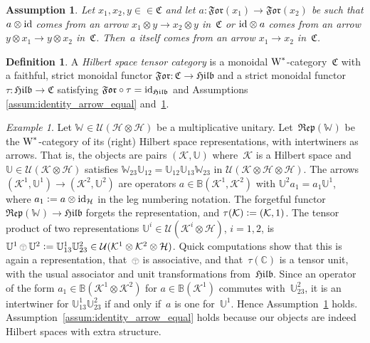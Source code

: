 \documentclass[a4paper]{amsart}
\numberwithin{equation}{section}
\theoremstyle{plain}
\numberwithin{theorem}{section}
\newtheorem{assumption}[theorem]{Assumption}
\theoremstyle{definition}
\newtheorem{definition}[theorem]{Definition}
\theoremstyle{remark}
\newtheorem{example}[theorem]{Example}
\newcommand{\tenscorep}{\mathbin{\begin{tikzpicture}[baseline,x=.75ex,y=.75ex] \draw[line width=.2pt] (-0.8,1.15)--(0.8,1.15);\draw[line width=.2pt](0,-0.25)--(0,1.15); \draw[line width=.2pt] (0,0.75) circle [radius = 1];\end{tikzpicture}}}
\newcommand*{\Corep}[1]{\mathbb{#1}}          %
\newcommand*{\inOb}{\mathrel{\in\in}}%
\newcommand*{\Cat}{\mathfrak C}     %
\newcommand*{\Hilb}{\mathfrak{Hilb}}%
\newcommand*{\Corepcat}[1]{\mathfrak{Rep}(#1)}%
\newcommand*{\Forget}{\mathfrak{For}}%
\newcommand*{\Trivial}{\tau}%
\newcommand*{\nb}{\nobreakdash}
\newcommand*{\C}{\mathbb C}
\newcommand*{\Bound}{\mathbb B}%
\newcommand*{\Id}{\textup{id}}%
\newcommand*{\Multunit}[1][]{\mathbb W^{#1}}%
\newcommand*{\Wst}{\textup W^*}%
\newcommand*{\Hils}[1][H]{\mathcal{#1}}%
\newcommand*{\U}{\mathcal U}%
\newcommand*{\defeq}{\mathrel{\vcentcolon=}}
\begin{document}
\begin{assumption}
  \label{assum:arrow_cancellative}
  Let \(x_1,x_2,y\inOb\Cat\)
  and let \(a\colon \Forget(x_1)\to\Forget(x_2)\)
  be such that \(a\otimes \Id\)
  comes from an arrow \(x_1\otimes y \to x_2\otimes y\)
  in~\(\Cat\)
  or \(\Id\otimes a\)
  comes from an arrow \(y\otimes x_1 \to y\otimes x_2\)
  in~\(\Cat\).
  Then~\(a\) itself comes from an arrow \(x_1\to x_2\) in~\(\Cat\).
\end{assumption}

\begin{definition}
  A \emph{Hilbert space tensor category} is a monoidal
  \(\Wst\)\nb-category~\(\Cat\)
  with a faithful, strict monoidal functor
  \(\Forget\colon \Cat\to\Hilb\)
  and a strict monoidal functor
  \(\Trivial\colon \Hilb\to\Cat\)
  satisfying \(\Forget\circ\Trivial=\Id_{\Hilb}\)
  and Assumptions \ref{assum:identity_arrow_equal}
  and~\ref{assum:arrow_cancellative}.
\end{definition}

\begin{example}
  \label{exa:Corepcat}
  Let \(\Multunit\in\U(\Hils\otimes\Hils)\)
  be a multiplicative unitary.  Let~\(\Corepcat{\Multunit}\)
  be the \(\Wst\)\nb-category
  of its (right) Hilbert space representations, with intertwiners as
  arrows.  That is, the objects are pairs \((\Hils[K],\Corep{U})\)
  where~\(\Hils[K]\)
  is a Hilbert space and \(\Corep{U}\in\U(\Hils[K]\otimes\Hils)\)
  satisfies
  \(\Multunit_{23} \Corep{U}_{12} = \Corep{U}_{12}\Corep{U}_{13}
  \Multunit_{23}\)
  in \(\U(\Hils[K]\otimes\Hils\otimes\Hils)\).
  The arrows \((\Hils[K]^1,\Corep{U}^1) \to (\Hils[K]^2,\Corep{U}^2)\)
  are operators \(a\in\Bound(\Hils[K]^1,\Hils[K]^2)\)
  with \(\Corep{U}^2 a_1 = a_1 \Corep{U}^1\),
  where \(a_1 \defeq a\otimes\Id_{\Hils}\) in the leg numbering notation.
  The forgetful functor \(\Corepcat{\Multunit} \to\Hilb\)
  forgets the representation, and
  \(\Trivial(\Hils[K]) \defeq (\Hils[K],1)\).
  The tensor product of two representations
  \(\Corep{U}^i \in \U(\Hils[K]^i \otimes\Hils)\),
  \(i=1,2\),
  is
  \(\Corep{U}^1\tenscorep \Corep{U}^2 \defeq \Corep{U}^1_{13}
  \Corep{U}^2_{23} \in \U(\Hils[K]^1\otimes\Hils[K]^2 \otimes\Hils)\).
  Quick computations show that this is again a representation,
  that~\(\tenscorep\) is associative, and that~\(\Trivial(\C)\)
  is a tensor unit, with the usual associator and unit transformations
  from~\(\Hilb\).
  Since an operator of the form
  \(a_1\in \Bound(\Hils[K]^1\otimes\Hils[K]^2)\)
  for \(a\in \Bound(\Hils[K]^1)\)
  commutes with~\(\Corep{U}^2_{23}\),
  it is an intertwiner for \(\Corep{U}^1_{13} \Corep{U}^2_{23}\)
  if and only if~\(a\)
  is one for~\(\Corep{U}^1\).
  Hence Assumption~\ref{assum:arrow_cancellative} holds.
  Assumption~\ref{assum:identity_arrow_equal} holds because our
  objects are indeed Hilbert spaces with extra structure.
\end{example}
\end{document}
